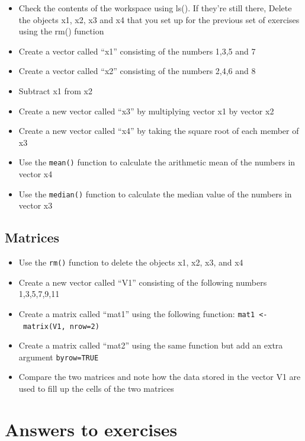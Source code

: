 \documentclass[
]{book}
\begin{document}
\begin{itemize}
\item
  Check the contents of the workspace using ls(). If they're still there, Delete the objects x1, x2, x3 and x4 that you set up for the previous set of exercises using the rm() function
\item
  Create a vector called ``x1'' consisting of the numbers 1,3,5 and 7
\item
  Create a vector called ``x2'' consisting of the numbers 2,4,6 and 8
\item
  Subtract x1 from x2
\item
  Create a new vector called ``x3'' by multiplying vector x1 by vector x2
\item
  Create a new vector called ``x4'' by taking the square root of each member of x3
\item
  Use the \texttt{mean()} function to calculate the arithmetic mean of the numbers in vector x4
\item
  Use the \texttt{median()} function to calculate the median value of the numbers in vector x3
\end{itemize}

\hypertarget{matrices-1}{%
\subsection{Matrices}\label{matrices-1}}

\begin{itemize}
\item
  Use the \texttt{rm()} function to delete the objects x1, x2, x3, and x4
\item
  Create a new vector called ``V1'' consisting of the following numbers 1,3,5,7,9,11
\item
  Create a matrix called ``mat1'' using the following function: \texttt{mat1\ \textless{}-\ matrix(V1,\ nrow=2)}
\item
  Create a matrix called ``mat2'' using the same function but add an extra argument \texttt{byrow=TRUE}
\item
  Compare the two matrices and note how the data stored in the vector V1 are used to fill up the cells of the two matrices
\end{itemize}

\hypertarget{answers-to-exercises-1}{%
\section{Answers to exercises}\label{answers-to-exercises-1}}
\end{document}
